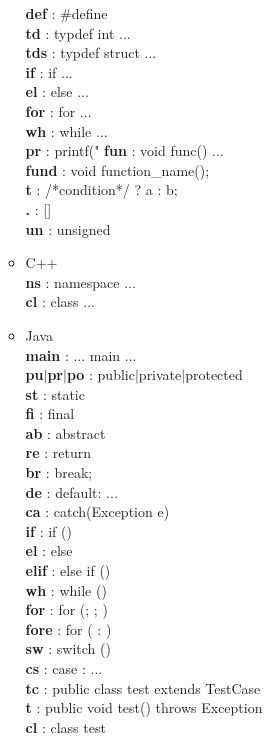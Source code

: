 \documentclass[10pt, a4paper]{article}
\begin{document}
\begin{enumerate}
\begin{itemize}
	\textbf{def} : \#define \\
	\textbf{td} : typdef int ... \\
	\textbf{tds} : typdef struct ... \\
	\textbf{if} : if ... \\
	\textbf{el} : else ... \\
	\textbf{for} : for ... \\
	\textbf{wh} : while ... \\
	\textbf{pr} : printf("%
	\textbf{fun} : void func() {} ... \\
	\textbf{fund} : void function\_name(); \\
	\textbf{t} : /*condition*/ ? a : b; \\
	\textbf{.} : [] \\
	\textbf{un} : unsigned
	\item C++ \\
	\textbf{ns} : namespace ... \\
	\textbf{cl} : class ... 
	\item Java \\
	\textbf{main} : ... main ... \\
	\textbf{pu{$|$}pr{$|$}po} : public{$|$}private{$|$}protected \\
	\textbf{st} : static \\
	\textbf{fi} : final \\
	\textbf{ab} : abstract \\
	\textbf{re} : return \\
	\textbf{br} : break; \\
	\textbf{de} : default: ... \\
	\textbf{ca} : catch(Exception e) \\
	\textbf{if} : if () \\
	\textbf{el} : else \\
	\textbf{elif} : else if () \\
	\textbf{wh} : while () \\
	\textbf{for} : for (; ; ) \\
	\textbf{fore} : for ( : ) \\
	\textbf{sw} : switch () \\
	\textbf{cs} : case : ... \\
	\textbf{tc} : public class test extends TestCase \\
	\textbf{t} : public void test() throws Exception \\
	\textbf{cl} : class test \\

\end{itemize}
\end{enumerate}
\end{document}
